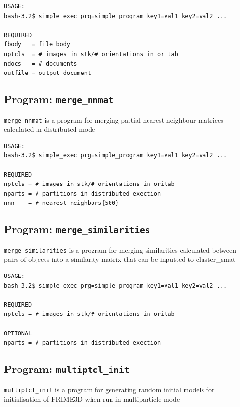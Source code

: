 \documentclass[a4paper,11pt]{article}
\newcommand{\prgname}[1]{\textcolor{NavyBlue}{\texttt{#1}}}
\begin{document}
\begin{verbatim}
USAGE:
bash-3.2$ simple_exec prg=simple_program key1=val1 key2=val2 ...

REQUIRED
fbody   = file body
nptcls  = # images in stk/# orientations in oritab
ndocs   = # documents
outfile = output document
\end{verbatim}

\subsection{Program: \prgname{merge\_nnmat}}
\label{merge_nnmat}
\prgname{merge\_nnmat} is a program for merging partial nearest neighbour matrices calculated in distributed mode

\begin{verbatim}
USAGE:
bash-3.2$ simple_exec prg=simple_program key1=val1 key2=val2 ...

REQUIRED
nptcls = # images in stk/# orientations in oritab
nparts = # partitions in distributed exection
nnn    = # nearest neighbors{500}
\end{verbatim}

\subsection{Program: \prgname{merge\_similarities}}
\label{merge_similarities}
\prgname{merge\_similarities} is a program for merging similarities calculated between pairs of objects into a similarity matrix that can be inputted to cluster\_smat

\begin{verbatim}
USAGE:
bash-3.2$ simple_exec prg=simple_program key1=val1 key2=val2 ...

REQUIRED
nptcls = # images in stk/# orientations in oritab

OPTIONAL
nparts = # partitions in distributed exection
\end{verbatim}

\subsection{Program: \prgname{multiptcl\_init}}
\label{multiptcl_init}
\prgname{multiptcl\_init} is a program for generating random initial models for initialisation of PRIME3D when run in multiparticle mode
\end{document}
